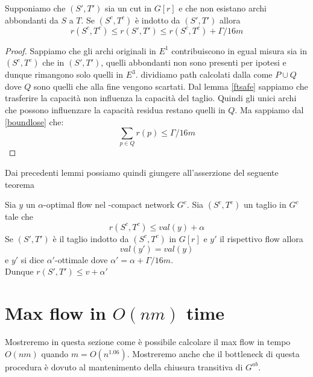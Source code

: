 \begin{lemma}{}{}
    Supponiamo che $(S',T')$ sia un cut in $G[r]$ e che non esistano archi abbondanti da $S$ a $T$.
    Se $(S^c,T^c)$ è indotto da $(S',T')$ allora \[ r(S^c,T^c) \le r(S',T')\le r(S^c,T^c)+\Gamma/16m\]
\end{lemma}
\begin{proof}
    Sappiamo che gli archi originali in $E^1$ contribuiscono in egual misura sia in $(S^c,T^c)$ che in $(S',T')$, quelli abbondanti non sono presenti per ipotesi e dunque rimangono solo quelli in $E^3$.
    dividiamo path calcolati dalla  come $P\cup Q$ dove $Q$ sono quelli che alla fine vengono scartati.
    Dal lemma \ref{ftsafe} sappiamo che trasferire la capacità non influenza la capacità del taglio. Quindi gli unici archi che possono influenzare la capacità residua restano quelli in $Q$.
    Ma sappiamo dal \cref{boundlose} che:
    \[\sum_{p\in Q}r(p)\le \Gamma/16m\]\QED
\end{proof}


Dai precedenti lemmi possiamo quindi giungere all'asserzione del seguente teorema
\begin{theorem}{}{}
    Sia $y$ un $\alpha$-optimal flow nel \gmm-compact network $G^c$.
    Sia $(S^c,T^c)$ un taglio in $G^c$ tale che \[r(S^c,T^c)\le val(y)+\alpha\] 
    Se $(S',T')$ è il taglio indotto da $(S^c,T^c)$ in $G[r]$ e $y'$ il rispettivo flow allora
    \[val(y') = val(y)\]
    e $y'$ si dice $\alpha'$-ottimale dove $\alpha' = \alpha + \Gamma/16m$.\\
    Dunque $r(S',T') \le v+\alpha'$
\end{theorem}

\section{Max flow in $O(nm)$ time}

Mostreremo in questa sezione come è possibile calcolare il max flow in tempo $O(nm)$ quando $m = O(n^{1.06})$.
Mostreremo anche che il bottleneck di questa procedura è dovuto al mantenimento della chiusura transitiva di $G^{ab}$.


